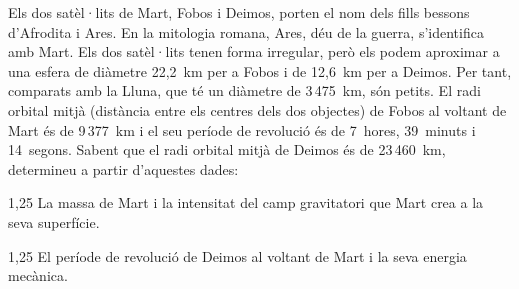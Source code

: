 Els dos satèl·lits de Mart, Fobos i Deimos, porten el nom dels fills bessons d'Afrodita i Ares. En la mitologia romana, Ares, déu de la guerra, s'identifica amb Mart. Els dos satèl·lits tenen forma irregular, però els podem aproximar a una esfera de diàmetre 22,2~km per a Fobos i de 12,6~km per a Deimos. Per tant, comparats amb la Lluna, que té un diàmetre de 3\,475~km, són petits. El radi orbital mitjà (distància entre els centres dels dos objectes) de Fobos al voltant de Mart és de 9\,377~km i el seu període de revolució és de 7~hores, 39~minuts i 14~segons. Sabent que el radi orbital mitjà de Deimos és de 23\,460~km, determineu a partir d'aquestes dades:

\begin{apartat}{1,25}
La massa de Mart i la intensitat del camp gravitatori que Mart crea a la seva superfície.
\end{apartat}

\begin{apartat}{1,25}
El període de revolució de Deimos al voltant de Mart i la seva energia mecànica.
\end{apartat}

